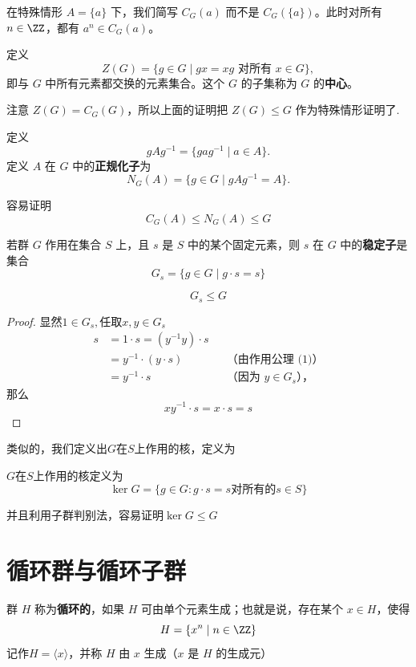 在特殊情形 $A=\{a\}$ 下，我们简写 $C_G(a)$ 而不是 $C_G(\{a\})$。此时对所有 $n\in\ZZ$，都有 $a^n\in C_G(a)$。

\begin{definition}
	定义
	\[
	Z(G)=\{g\in G\mid gx=xg\text{ 对所有 }x\in G\},
	\]
	即与 $G$ 中所有元素都交换的元素集合。这个 $G$ 的子集称为 $G$ 的\textbf{中心}。
\end{definition}
注意 $Z(G)=C_G(G)$，所以上面的证明把 $Z(G)\leq G$ 作为特殊情形证明了.

\begin{definition}
	定义
\[
gAg^{-1}=\{gag^{-1}\mid a\in A\}.
\]
定义 $A$ 在 $G$ 中的\textbf{正规化子}为
\[
N_G(A)=\{g\in G\mid gAg^{-1}=A\}.
\]
\end{definition}
容易证明
\[C_G(A)\leqslant N_G(A)\leqslant G \]


\begin{definition}
	若群 $G$ 作用在集合 $S$ 上，且 $s$ 是 $S$ 中的某个固定元素，则 $s$ 在 $G$ 中的\textbf{稳定子}是集合
\[
G_s=\{g\in G\mid g\cdot s=s\}
\]
\end{definition}
\begin{proposition}
\[ 	G_s\leqslant G \]
\end{proposition}
\begin{proof}
	显然$1 \in G_s,$任取$x,y \in G_s $
	\begin{align*}
		s &= 1\cdot s=(y^{-1}y)\cdot s\\
		&= y^{-1}\cdot (y\cdot s) &&\text{（由作用公理 (1)）}\\
		&= y^{-1}\cdot s &&\text{（因为 $y\in G_s$），}
	\end{align*}
	那么
	\[xy^{-1}\cdot s= x\cdot s = s\]
	
\end{proof}
类似的，我们定义出$G$在$S$上作用的核，定义为
\begin{definition}
	$G$在$S$上作用的核定义为 
	\[\ker G = \{ g\in G : g\cdot s =s \text{对所有的}s\in S\}\]
\end{definition}
并且利用子群判别法，容易证明$\ker G \leqslant G$

\section{循环群与循环子群}


\begin{definition}
	 群 $H$ 称为\textbf{循环的}，如果 $H$ 可由单个元素生成；也就是说，存在某个 $x\in H$，使得
	\[
	H=\{x^n\mid n\in\ZZ\}
	\]
	记作$H=\langle x\rangle$，并称 $H$ 由 $x$ 生成（$x$ 是 $H$ 的生成元）
\end{definition}

